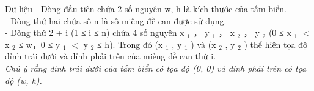 Dữ liệu
- Dòng đầu tiên chứa 2 số nguyên w, h là kích thước của tấm biển.   
\\   - Dòng thứ hai chứa số n là số miếng đề can được sử dụng.   
\\   - Dòng thứ 2 + i (1 ≤ i ≤ n) chứa 4 số nguyên x   $_    1   $   ， y   $_    1   $   ， x   $_    2   $   ， y   $_    2   $   (0 ≤ x   $_    1   $   $<$ x   $_    2   $   ≤ w，0 ≤ y   $_    1   $   $<$ y   $_    2   $   ≤ h). Trong đó (x   $_    1   $   , y   $_    1   $   ) và (x   $_    2   $   , y   $_    2   $   ) thể hiện tọa độ đỉnh trái dưới và đỉnh phải trên của miếng đề can thứ i.   
\\\textit{     Chú ý rằng đỉnh trái dưới của tấm biển có tọa độ (0, 0) và đỉnh phải trên có tọa độ (w, h).    }